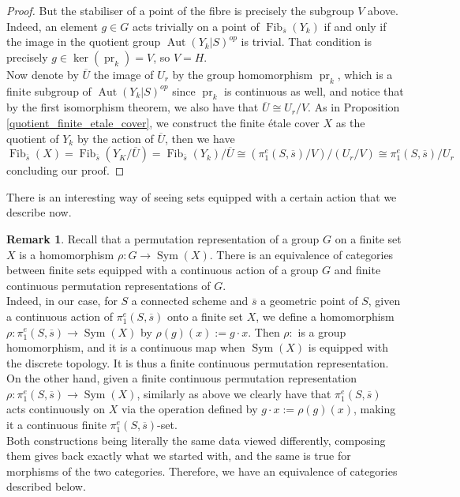 \documentclass{article}
\theoremstyle{plain}
\theoremstyle{definition}
\newtheorem{remark}{Remark}
\DeclareMathOperator{\Fib}{Fib}
\DeclareMathOperator{\Aut}{Aut}
\DeclareMathOperator{\Sym}{Sym}
\DeclareMathOperator{\pr}{pr}
\begin{document}
\begin{proof}
But the stabiliser of a point of the fibre is precisely the subgroup $V$ above. 
Indeed, an element $g\in G$ acts trivially on a point of $\Fib_{\overline{s}}(Y_k)$ if and only if the image in the quotient group $\Aut(Y_k|S)^{op}$ is trivial.
That condition is precisely $g\in \ker(\pr_k)= V$, so $V = H$.\\
Now denote by $\overline{U}$ the image of $U_r$ by the group homomorphism $\pr_k$, which is a finite subgroup of $\Aut(Y_k|S)^{op}$ since $\pr_k$ is continuous as well, and notice that by the first isomorphism theorem, we also have that $\overline{U}\cong U_r /V$.
As in Proposition \ref{quotient_finite_etale_cover}, we construct the finite \'etale cover $X$ as the quotient of $Y_k$ by the action of $\overline{U}$, then we have 
$$\Fib_{\overline{s}}(X) = \Fib_{\overline{s}}(Y_K/\overline{U}) = \Fib_{\overline{s}}(Y_k)/ \overline{U} \cong (\pi_1^e(S,\overline{s})/ V) / (U_r/V) \cong \pi_1^e(S,\overline{s}) / U_r$$
concluding our proof.
\end{proof}


\noindent There is an interesting way of seeing sets equipped with a certain action that we describe now.


\begin{remark}
    Recall that a permutation representation of a group $G$ on a finite set $X$ is a homomorphism $\rho:G\rightarrow \Sym(X)$.
    There is an equivalence of categories between 
    finite sets equipped with a continuous action of a group $G$
    and finite continuous permutation representations of $G$.\\
    Indeed, in our case, for $S$ a connected scheme and $\overline{s}$ a geometric point of $S$, given a continuous action of $\pi^e_1(S,\overline{s})$ onto a finite set $X$, 
    we define a homomorphism $\rho : \pi^e_1(S,\overline{s}) \rightarrow \Sym(X)$ by $\rho(g)(x):= g\cdot x$.
    Then $\rho:$ is a group homomorphism, and it is a continuous map when $\Sym(X)$ is equipped with the discrete topology. 
    It is thus a finite continuous permutation representation.\\
    On the other hand, 
    given a finite continuous permutation representation $\rho : \pi^e_1(S,\overline{s}) \rightarrow \Sym(X)$, similarly as above we clearly have that $\pi^e_1(S,\overline{s})$ acts continuously on $X$ via the operation defined by $g\cdot x := \rho(g)(x)$, making it a continuous finite $\pi^e_1(S,\overline{s})$-set.\\
    Both constructions being literally the same data viewed differently, composing them gives back exactly what we started with, and the same is true for morphisms of the two categories. 
    Therefore, we have an equivalence of categories described below.
\end{remark}
\end{document}
